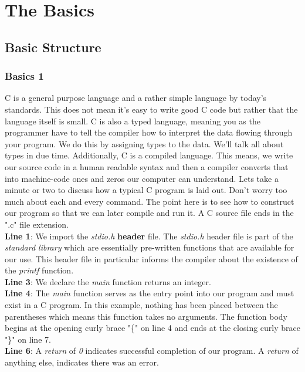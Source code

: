 \documentclass[../main.tex]{subfiles}
\begin{document}

\chapter{The Basics}


\section{Basic Structure}
\subsection{Basics 1}
C is a general purpose language and a rather simple language by today's standards.  This does not mean it's easy to write good C code but rather that the language itself is small. C is also a typed language, meaning you as the programmer have to tell the compiler how to interpret the data flowing through your program.  We do this by assigning types to the data.  We'll talk all about types in due time.  Additionally, C is a compiled language.  This means, we write our source code in a human readable syntax and then a compiler converts that into machine-code ones and zeros our computer can understand.  Lets take a minute or two to discuss how a typical C program is laid out.  Don't worry too much about each and every command.  The point here is to see how to construct our program so that we can later compile and run it. A C source file ends in the ".c" file extension.
\\


\textbf{Line 1}: We import the \textit{stdio.h} \textbf{header} file. The \textit{stdio.h} header file is part of the \textit{standard library} which are essentially pre-written functions that are available for our use. This header file in particular informs the compiler about the existence of the \textit{printf} function.\\
\textbf{Line 3}: We declare the \textit{main} function returns an integer.\\
\textbf{Line 4}: The \textit{main} function serves as the entry point into our program and must exist in a C program.  In this example, nothing has been placed between the parentheses which means this function takes no arguments. The function body begins at the opening curly brace "\{" on line 4 and ends at the closing curly brace "\}" on line 7.\\
\textbf{Line 6}: A \textit{return} of \textit{0} indicates successful completion of our program.  A \textit{return} of anything else, indicates there was an error.\\
\end{document}
